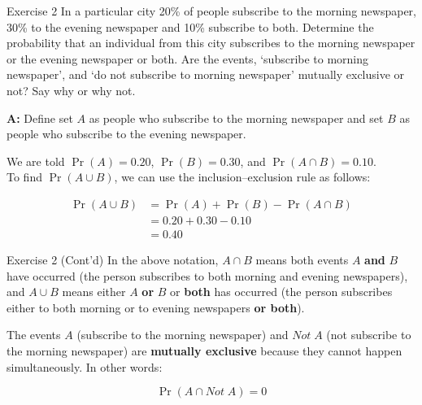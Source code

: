 \documentclass[
  ignorenonframetext,
  aspectratio=43,
]{beamer}
\begin{document}
\begin{frame}{Exercise 2}
\protect\hypertarget{exercise-2}{}
In a particular city 20\% of people subscribe to the morning newspaper,
30\% to the evening newspaper and 10\% subscribe to both. Determine the
probability that an individual from this city subscribes to the morning
newspaper or the evening newspaper or both. Are the events, `subscribe
to morning newspaper', and `do not subscribe to morning newspaper'
mutually exclusive or not? Say why or why not.

\pause

\textbf{A:} Define set \(A\) as people who subscribe to the morning
newspaper and set \(B\) as people who subscribe to the evening
newspaper.

We are told \(\Pr(A) = 0.20\), \(\Pr(B) = 0.30\), and
\(\Pr(A \cap B) = 0.10\).\\
To find \(\Pr(A \cup B)\), we can use the inclusion--exclusion rule as
follows:

\[
\begin{aligned}
\Pr(A \cup B) & = \Pr(A) + \Pr(B) - \Pr(A \cap B) \\
              & = 0.20 + 0.30 - 0.10 \\
              & = 0.40 
\end{aligned}
\]
\end{frame}

\begin{frame}{Exercise 2 (Cont'd)}
\protect\hypertarget{exercise-2-contd}{}
In the above notation, \(A \cap B\) means both events \(A\) \textbf{and}
\(B\) have occurred (the person subscribes to both morning and evening
newspapers), and \(A \cup B\) means either \(A\) \textbf{or} \(B\) or
\textbf{both} has occurred (the person subscribes either to both morning
or to evening newspapers \textbf{or both}).

The events \(A\) (subscribe to the morning newspaper) and \(Not \; A\)
(not subscribe to the morning newspaper) are \textbf{mutually exclusive}
because they cannot happen simultaneously. In other words:

\[
\Pr(A \cap Not \; A) = 0
\]
\end{frame}
\end{document}
